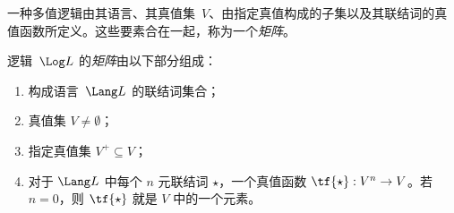 \documentclass[../../../include/open-logic-section]{subfiles}
\begin{document}


一种多值逻辑由其语言、其真值集~$V$、由指定真值构成的子集以及其联结词的真值函数所定义。这些要素合在一起，称为一个\emph{矩阵}。

\begin{defn}[矩阵]
逻辑~$\Log L$ 的\emph{矩阵}由以下部分组成：
\begin{enumerate}
\item 构成语言~$\Lang L$ 的联结词集合；
\item 真值集 $V \neq \emptyset$；
\item 指定真值集 $V^+ \subseteq V$；
\item 对于 $\Lang L$ 中每个 $n$ 元联结词 $\star$，一个真值函数 $\tf{\star} : V^n \to V$。若 $n = 0$，则 $\tf{\star}$ 就是 $V$ 中的一个元素。
\end{enumerate}
\end{defn}
\end{document}
